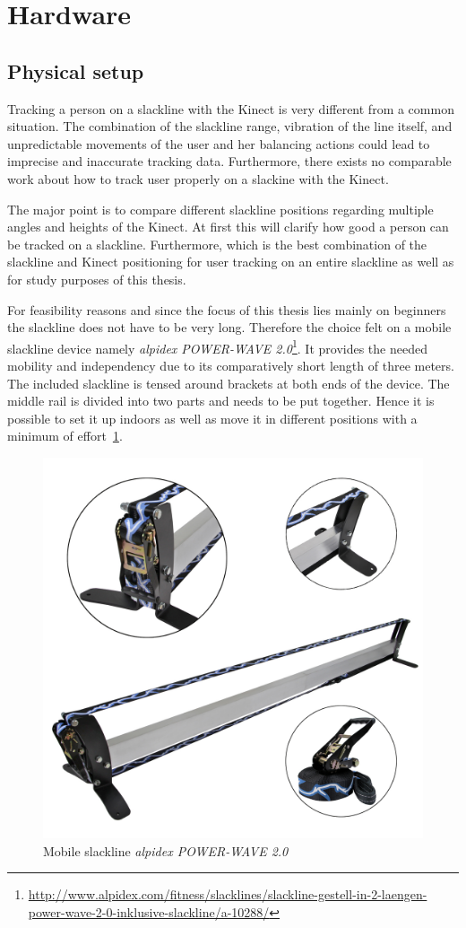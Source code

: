 \section{Hardware}\label{5_1_technicalFeasibility}
\subsection{Physical setup}
 
Tracking a person on a slackline with the Kinect is very different from a common situation.
The combination of the slackline range, vibration of the line itself, and unpredictable movements of the user and her balancing actions could lead to imprecise and inaccurate tracking data.
Furthermore, there exists no comparable work about how to track user properly on a slackine with the Kinect.

The major point is to compare different slackline positions regarding multiple angles and heights of the Kinect. At first this will clarify how good a person can be tracked on a slackline. Furthermore, which is the best combination of the slackline and Kinect positioning for user tracking on an entire slackline as well as for study purposes of this thesis.

For feasibility reasons and since the focus of this thesis lies mainly on beginners the slackline does not have to be very long. Therefore the choice felt on a mobile slackline device namely \textit{alpidex POWER-WAVE 2.0}\footnote{\url{http://www.alpidex.com/fitness/slacklines/slackline-gestell-in-2-laengen-power-wave-2-0-inklusive-slackline/a-10288/}}. It provides the needed mobility and independency due to its comparatively short length of three meters. The included slackline is tensed around brackets at both ends of the device. The middle rail is divided into two parts and needs to be put together. Hence it is possible to set it up indoors as well as move it in different positions with a minimum of effort~\ref{fig:3_2_mobileSlackline}.
\begin{figure}[htb]
	\centering
	\begin{minipage}[t]{1\linewidth}
		\centering
		\includegraphics[width=0.44\linewidth]{Pictures/3_2_mobileSlackline}
		\caption{Mobile slackline \textit{alpidex POWER-WAVE 2.0}~\cite{alpidex2017-ms}}
		\label{fig:3_2_mobileSlackline}
	\end{minipage}
\end{figure}

